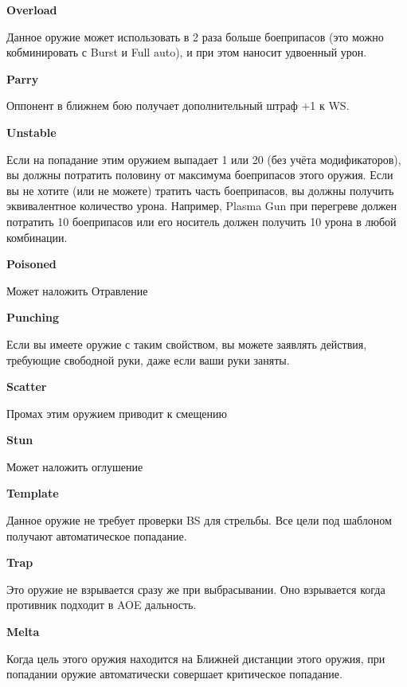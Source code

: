 \begin{multicols}{2}
        \textbf{Overload}

        Данное оружие может использовать в 2 раза больше боеприпасов (это можно кобминировать с Burst и Full auto), и при этом наносит удвоенный урон.

        \textbf{Parry}

        Оппонент в ближнем бою получает дополнительный штраф +1 к WS.

        \textbf{Unstable}

        Если на попадание этим оружием выпадает 1 или 20 (без учёта модификаторов), вы должны потратить половину от максимума боеприпасов этого оружия.
        Если вы не хотите (или не можете) тратить часть боеприпасов, вы должны получить эквивалентное количество урона.
        Например, Plasma Gun при перегреве должен потратить 10 боеприпасов или его носитель должен получить 10 урона в любой комбинации.

        \textbf{Poisoned}

        Может наложить Отравление

        \textbf{Punching}

        Если вы имеете оружие с таким свойством, вы можете заявлять действия, требующие свободной руки, даже если ваши руки заняты.

        \textbf{Scatter}

        Промах этим оружием приводит к смещению

        \textbf{Stun}

        Может наложить оглушение

        \textbf{Template}

        Данное оружие не требует проверки BS для стрельбы. Все цели под шаблоном получают автоматическое попадание.

        \textbf{Trap}

        Это оружие не взрывается сразу же при выбрасывании. Оно взрывается когда противник подходит в AOE дальность.

        \textbf{Melta}

        Когда цель этого оружия находится на Ближней дистанции этого оружия, при попадании оружие автоматически совершает критическое попадание.

    \end{multicols}
